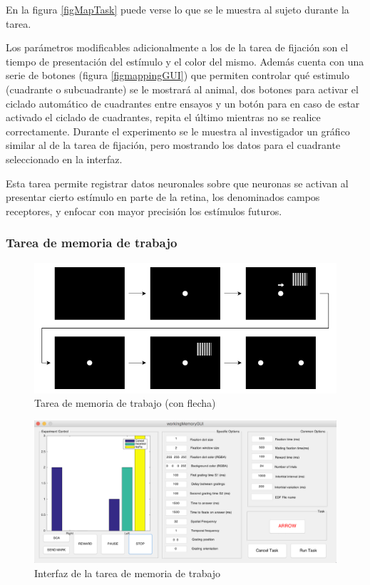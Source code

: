 \documentclass[conference]{IEEEtran}
\begin{document}
En la figura \ref{figMapTask} puede verse lo que se le muestra al sujeto durante la tarea. 



Los parámetros modificables adicionalmente a los de la tarea de fijación son el tiempo de presentación del estímulo y el color del mismo. Además cuenta con una serie de botones (figura \ref{figmappingGUI}) que permiten controlar qué estimulo (cuadrante o subcuadrante) se le mostrará al animal, dos botones para activar el ciclado automático de cuadrantes entre ensayos y un botón para en caso de estar activado el ciclado de cuadrantes, repita el último mientras no se realice correctamente.
Durante el experimento se le muestra al investigador un gráfico similar al de la tarea de fijación, pero mostrando los datos para el cuadrante seleccionado en la interfaz.


Esta tarea permite registrar datos neuronales sobre que neuronas se activan al presentar cierto estímulo en parte de la retina, los denominados campos receptores,  y enfocar con mayor precisión los estímulos futuros.


\subsubsection*{Tarea de memoria de trabajo}

\begin{figure}[htbp]
\centerline{\includegraphics[width=\linewidth]{figures/memory_task}}
\caption{Tarea de memoria de trabajo (con flecha)}
\label{figMemoryTask}
\end{figure}

\begin{figure}
  \includegraphics[width=\textwidth]{figures/memory_gui}
  \caption{Interfaz de la tarea de memoria de trabajo}
  \label{figMemoryGui}

\end{figure}
\end{document}
